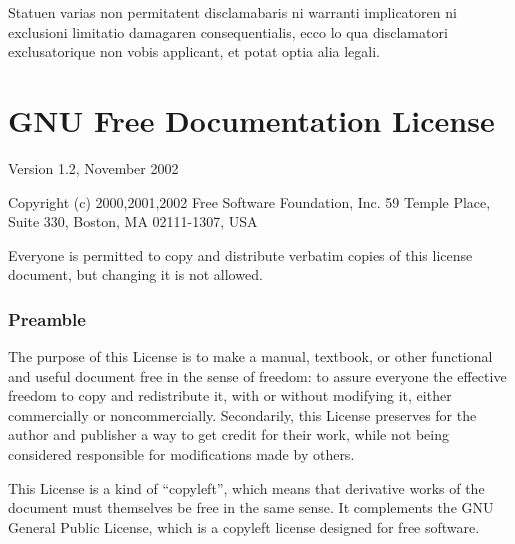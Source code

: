 
Statuen varias non permitatent disclamabaris ni warranti implicatoren
ni exclusioni limitatio damagaren consequentialis, ecco lo qua disclamatori
exclusato\-rique non vobis applicant, et potat optia alia legali.

\twocolumn

\chapter{GNU Free Documentation License\label{sec:GFDL} }

{\footnotesize{}Version 1.2, November 2002}{\footnotesize\par}

{\tiny{}Copyright (c) 2000,2001,2002 Free Software Foundation, Inc.
59 Temple Place, Suite 330, Boston, MA 02111-1307, USA}{\tiny\par}

{\tiny{}Everyone is permitted to copy and distribute verbatim copies
of this license document, but changing it is not allowed.}{\tiny\par}

{\tiny{}\setcounter{subsection}{-1}}{\tiny\par}

\subsection*{{\tiny{}Preamble}}

{\tiny{}The purpose of this License is to make a manual, textbook,
or other functional and useful document free in the sense of freedom:
to assure everyone the effective freedom to copy and redistribute
it, with or without modifying it, either commercially or noncommercially.
Secondarily, this License preserves for the author and publisher a
way to get credit for their work, while not being considered responsible
for modifications made by others.}{\tiny\par}

{\tiny{}This License is a kind of \textquotedblleft copyleft\textsf{''}, which
means that derivative works of the document must themselves be free
in the same sense. It complements the GNU General Public License,
which is a copyleft license designed for free software.}{\tiny\par}

